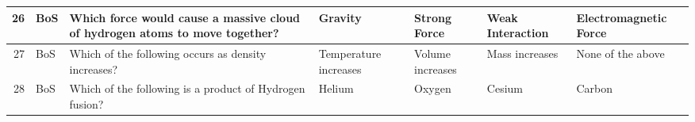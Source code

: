 \documentclass[10pt]{article}
\begin{document}
\begin{tiny}
\begin{longtable}{|r|p{0.375in}|p{1.275in}|p{0.75in}|p{0.75in}|p{0.75in}|p{0.75in}|}
    26    &     BoS &                                                                                                                                                                                                      Which force would cause a massive cloud of hydrogen atoms to move together? &                                                                                                                               Gravity &                                                                                          Strong Force &                                                                                                           Weak Interaction &                                                                                                             Electromagnetic Force \\\hline
    27    &     BoS &                                                                                                                                                                                                                              Which of the following occurs as density increases? &                                                                                                                 Temperature increases &                                                                                      Volume increases &                                                                                                             Mass increases &                                                                                                                 None of the above \\\hline
    28    &     BoS &                                                                                                                                                                                                                          Which of the following is a product of Hydrogen fusion? &                                                                                                                                Helium &                                                                                                Oxygen &                                                                                                                     Cesium &                                                                                                                            Carbon \\\hline

\end{longtable}
\end{tiny}
\end{document}

